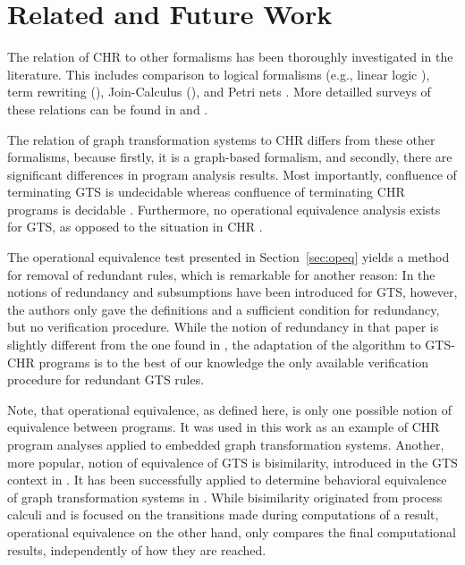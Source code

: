 \documentclass{tlp}
\begin{document}
\section{Related and Future Work}
\label{sec:related_work}

The relation of CHR to other formalisms has been thoroughly investigated in the
literature. This includes comparison to logical formalisms (e.g., linear logic
\cite{Betz2005}), term rewriting
(\cite{duck_stuck_brand_acd_term_rewriting_iclp06}), Join-Calculus
(\cite{lam_sulz_finallyjoin_chr08}), and Petri nets \cite{betz_petri_nets_chr07}.
More detailled surveys of these relations can be found in
\cite{chr_survey_tplp08} and \cite{fruehwirth09}.

The relation of graph transformation systems to CHR differs from these other
formalisms, because firstly, it is a graph-based formalism, and secondly, there
are significant differences in program analysis results. Most importantly,
confluence of terminating GTS is undecidable \cite{plump05} whereas confluence of
terminating CHR programs is decidable \cite{abdennadherfruehwirthmeuss99}.
Furthermore, no operational equivalence analysis exists for GTS, as opposed to
the situation in CHR \cite{abdennadherfruehwirth99}.

The operational equivalence test presented in Section~\ref{sec:opeq} yields a
method for removal of redundant rules, which is remarkable for another reason: In
\cite{Kreowski2000} the notions of redundancy and subsumptions have been
introduced for GTS, however, the authors only gave the definitions and a
sufficient condition for redundancy, but no verification procedure. While the
notion of redundancy in that paper is slightly different from the one found in
\cite{Abdennadher2003}, the adaptation of the algorithm to GTS-CHR programs is to
the best of our knowledge the only available verification procedure for redundant
GTS rules.

Note, that operational equivalence, as defined here, is only one possible notion
of equivalence between programs. It was used in this work as an example of CHR
program analyses applied to embedded graph transformation systems. Another, more
popular, notion of equivalence of GTS is bisimilarity, introduced in the GTS
context in \cite{Ehrig2004}. It has been successfully applied to determine
behavioral equivalence of graph transformation systems in \cite{Rangel2008}.
While bisimilarity originated from process calculi and is focused on the
transitions made during computations of a result, operational equivalence on the
other hand, only compares the final computational results, independently of how
they are reached.
\end{document}
